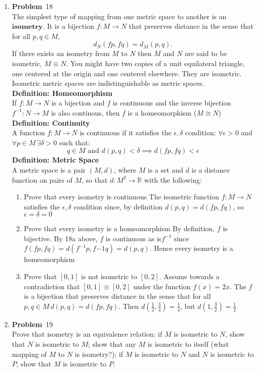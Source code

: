 \documentclass[12pt]{amsart}
\newcommand{\benu}{\begin{enumerate}}
\newcommand{\eenu}{\end{enumerate}}
\theoremstyle{definition}
\newcommand{\mbR}{\mathbb{R}}
\newcommand{\itep}{\item {\bfseries Problem}\ }
\begin{document}
\begin{enumerate}[series=p]
\itep 18\\
The simplest type of mapping from one metric space to another is an $\textbf{isometry}$.  It is a bijection $f:M \rightarrow N$ that preserves distance in the sense that for all $p,q \in M$,
$$d_N(fp, fq) = d_M(p,q).$$
If there exists an isometry from $M$ to $N$ then $M$ and $N$ are said to be isometric, $M \equiv N$.  You might have two copies of a unit equilateral triangle, one centered at the origin and one centered elsewhere.  They are isometric.  Isometric metric spaces are indistinguishable as metric spaces.
\\
\textbf{Definition: Homeomorphism}\\
If $f:M \to N$ is a bijection and $f$ is continuous and the inverse bijection $f^{-1}: N \to M$ is also continous, then $f$ is a homeomorphism ($M \cong N$)
\\
\textbf{Definition: Continuity}\\
A function $f: M \to N$ is continuous if it satisfies the $\epsilon , \delta$ condition: $\forall \epsilon > 0$ and $\forall p \in M \, \exists \delta > 0$ such that:\\
$$ q \in M \text{ and } d(p,q) < \delta \implies d(fp, fq) < \epsilon$$
\textbf{Definition: Metric Space}\\
A metric space is a pair $(M, d)$, where $M$ is a set and $d$ is a distance function on pairs of $M$, so that $d : M^2 \to \mbR$ with the following:
\\
\benu
\item Prove that every isometry is continuous
The isometric function $f: M \to N$ satisfies the $\epsilon , \delta$ condition since, by definition $d(p, q) = d(fp, fq)$, so $\epsilon = \delta = 0$
\item Prove that every isometry is a homeomorphism
By definition, $f$ is bijective.  By 18a above, $f$ is continuous as is$f^{-1}$ since $f(fp, fq) = d(f^{-1}p, f{-1}q) = d(p,q)$.  Hence every isometry is a homeomorphism
\item Prove that $[0,1]$ is not isometric to $[0,2]$.
Assume towards a contradiction that $[0,1] \equiv [0,2]$ under the function $f(x) = 2x$.  The $f$ is a bijection that preserves distance in the sense that for all $p,q \in M \, d(p,q) = d(fp, fq)$.  Then $d(\frac{1}{2}, \frac{3}{4}) = \frac{1}{4}$, but $d(1, \frac{3}{2}) = \frac{1}{2}$\hfill\lightning
\eenu
\newpage
\itep 19\\
Prove that isometry is an equivalence relation: if $M$ is isometric to $N$, show that $N$ is isometric to $M$; show that any $M$ is isometric to itself (what mapping of $M$ to $N$ is isometry?); if $M$ is isometric to $N$ and $N$ is isometric to $P$, show that $M$ is isometric to $P$.

\end{enumerate}
\end{document}
